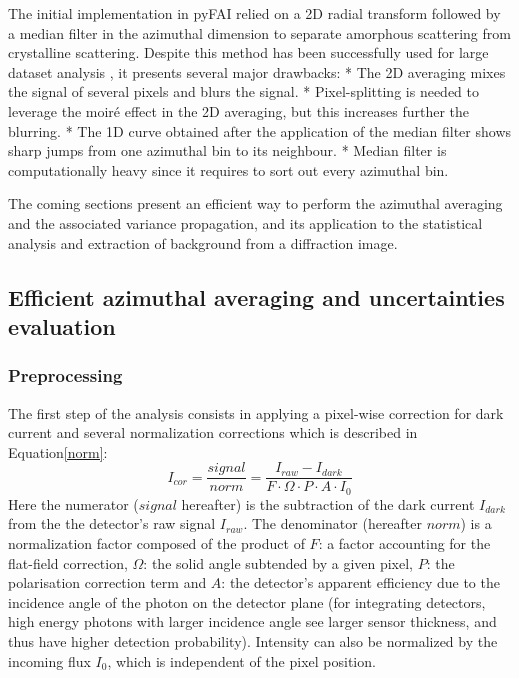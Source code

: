 \documentclass[preprint]{iucr}              %
\begin{document}
The initial implementation in pyFAI \cite{pdj2013} relied on a 2D radial transform followed by a median filter in the azimuthal dimension 
to separate amorphous scattering from crystalline scattering.
Despite this method has been successfully used for large dataset analysis \cite{brocades}, it presents several major drawbacks:
* The 2D averaging mixes the signal of several pixels and blurs the signal. 
* Pixel-splitting is needed to leverage the moiré effect in the 2D averaging, but this increases further the blurring. 
* The 1D curve obtained after the application of the median filter shows sharp jumps from one azimuthal bin to its neighbour.
* Median filter is computationally heavy since it requires to sort out every azimuthal bin.

The coming sections present an efficient way to perform the azimuthal averaging and the associated variance propagation, and its application to the statistical analysis and extraction of background from a diffraction image. 

\subsection{Efficient azimuthal averaging and uncertainties evaluation}

\subsubsection{Preprocessing}
The first step of the analysis consists in applying a pixel-wise correction for dark current and several normalization corrections\cite{pyfai_2020} which is described in Equation\ref{norm}:
\begin{equation}
\label{norm}
I_{cor} = \frac{signal}{norm}  = \frac{I_{raw} - I_{dark}}{F \cdot
\Omega \cdot P \cdot A \cdot I_0} 
\end{equation}
Here the numerator ($signal$ hereafter) is the subtraction of the dark current $I_{dark}$ from the the detector's raw signal $I_{raw}$.
The denominator (hereafter $norm$) is a normalization factor composed of the product of  $F$:  a factor accounting for the flat-field correction, $\Omega$: the solid
angle subtended by a given pixel, $P$: the polarisation correction term and
$A$: the detector's apparent efficiency due to the incidence angle of the
photon on the detector plane (for integrating detectors, high energy photons with
larger incidence angle see larger sensor thickness, and thus have higher
detection probability).
Intensity can also be normalized by the incoming flux $I_0$, which is independent of the pixel position.
\end{document}
